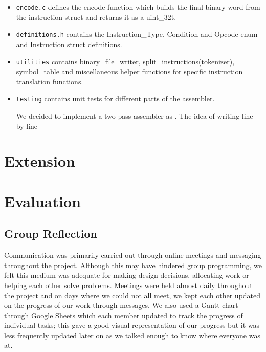 \documentclass[11pt]{article}
\begin{document}
\begin{itemize}
\item \texttt{encode.c} defines the encode function which builds the final binary word from the instruction struct and returns it as a uint\_32t.

\item \texttt{definitions.h} contains the Instruction\_Type, Condition and Opcode enum and Instruction struct definitions.

\item \texttt{utilities} contains binary\_file\_writer, split\_instructions(tokenizer), symbol\_table and miscellaneous helper functions for specific instruction translation functions.

\item \texttt{testing} contains unit tests for different parts of the assembler.

We decided to implement a two pass assembler as . The idea of writing line by line

\end{itemize}

  \section*{Extension}

  \subsection*{}
  \subsection*{}
  \subsection*{}

  \section*{Evaluation}

  \subsection*{Group Reflection}

Communication was primarily carried out through online meetings and messaging throughout the project. Although this may have hindered group programming, we felt this medium was adequate for making design decisions, allocating work or helping each other solve problems. Meetings were held almost daily throughout the project and on days where we could not all meet, we kept each other updated on the progress of our work through messages. We also used a Gantt chart through Google Sheets which each member updated to track the progress of individual tasks; this gave a good visual representation of our progress but it was less frequently updated later on as we talked enough to know where everyone was at.
\end{document}
